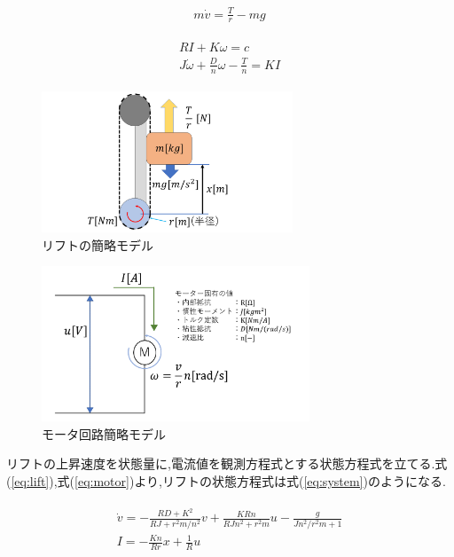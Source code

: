 \documentclass[twocolumn,11pt]{abst}
\begin{document}
\begin{eqnarray}
m\dot{v}=\frac{T}{r}-mg
\label{eq:lift}
\end{eqnarray}

\begin{eqnarray}
\begin{array}{l}
RI+K{\omega}=c\\
J\dot{\omega}+\frac{D}{n}{\omega}-\frac{T}{n}=KI
\end{array}
\label{eq:motor}
\end{eqnarray}

\begin{figure}[htbp]
  \begin{center}
    \includegraphics[width=75mm]{img/liftModel.png}
    \end{center}
  \caption{リフトの簡略モデル}
 \label{fig:liftModel}
\end{figure}

\begin{figure}[htbp]
  \begin{center}
    \includegraphics[width=80mm]{img/circuitmodel.png}
    \end{center}
  \caption{モータ回路簡略モデル}
 \label{fig:circuitModel}
\end{figure}

リフトの上昇速度を状態量に,電流値を観測方程式とする状態方程式を立てる.式(\ref{eq:lift}),式(\ref{eq:motor})より,リフトの状態方程式は式(\ref{eq:system})のようになる.

\begin{eqnarray}
\begin{array}{l}
\dot{v}=-\frac{RD+K^2}{RJ+r^{2}m/n^2}v+\frac{KRn}{RJn^{2}+r^{2}m}u-\frac{g}{Jn^{2}/r^{2}m+1}\\
I=-\frac{Kn}{Rr}x+\frac{1}{R}u
\end{array}
\label{eq:system}
\end{eqnarray}
\end{document}

